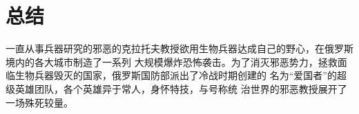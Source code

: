 \documentclass{icsartcn}
\begin{document}
\section{总结}
一直从事兵器研究的邪恶的克拉托夫教授欲用生物兵器达成自己的野心，在俄罗斯境内的各大城市制造了一系列
大规模爆炸恐怖袭击。为了消灭邪恶势力，拯救面临生物兵器毁灭的国家，俄罗斯国防部派出了冷战时期创建的
名为“爱国者”的超级英雄团队，各个英雄异于常人，身怀特技，与号称统 治世界的邪恶教授展开了一场殊死较量。



\appendix


\printindex{}
\backmatter
\end{document}
